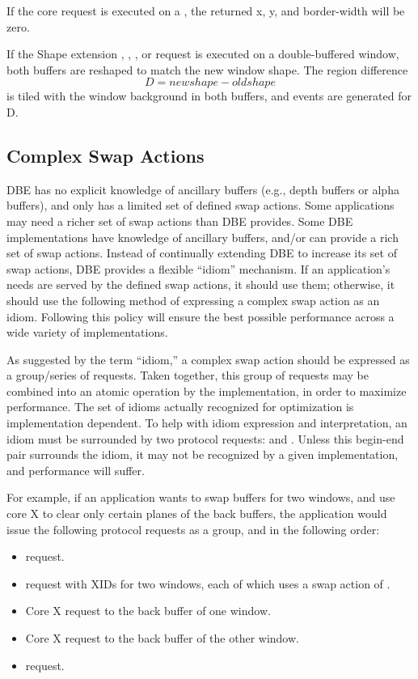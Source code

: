 If the core  request is executed on a
, the returned x, y, and border-width will be
zero.

If the Shape extension ,
, , or
 request is executed on a double-buffered
window, both buffers are reshaped to match the new window shape.  The
region difference \[ D = new shape - old shape \] is tiled with the
window background in both buffers, and  events are
generated for D.

\subsection{Complex Swap Actions}

DBE has no explicit knowledge of ancillary buffers (e.g., depth buffers
or alpha buffers), and only has a limited set of defined swap actions.
Some applications may need a richer set of swap actions than DBE
provides.  Some DBE implementations have knowledge of ancillary
buffers, and/or can provide a rich set of swap actions.  Instead of
continually extending DBE to increase its set of swap actions, DBE
provides a flexible ``idiom'' mechanism.  If an application's needs
are served by the defined swap actions, it should use them; otherwise,
it should use the following method of expressing a complex swap action
as an idiom.  Following this policy will ensure the best possible
performance across a wide variety of implementations.

As suggested by the term ``idiom,'' a complex swap action should be
expressed as a group/series of requests.  Taken together, this group
of requests may be combined into an atomic operation by the
implementation, in order to maximize performance.  The set of idioms
actually recognized for optimization is implementation dependent.  To
help with idiom expression and interpretation, an idiom must be
surrounded by two protocol requests:  and
.  Unless this begin-end pair surrounds the
idiom, it may not be recognized by a given implementation, and
performance will suffer.

For example, if an application wants to swap buffers for two windows,
and use core X to clear only certain planes of the back buffers, the
application would issue the following protocol requests as a group, and
in the following order:

\begin{itemize}
\item {} request.
\item {} request with XIDs for two windows, each
of which uses a swap action of .
\item Core X  request to the back buffer of one window.
\item Core X  request to the back buffer of the other window.
\item {} request.
\end{itemize}

